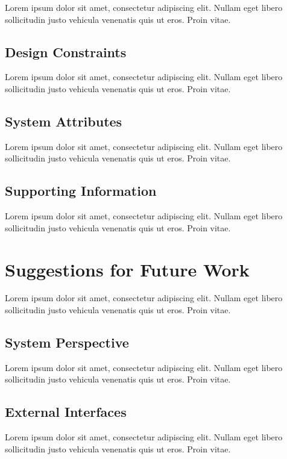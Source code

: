 \documentclass[a4paper]{article}
\begin{document}
        Lorem ipsum dolor sit amet, consectetur adipiscing elit. Nullam eget libero sollicitudin justo vehicula venenatis quis ut eros. Proin vitae.

        \subsection{Design Constraints}

        Lorem ipsum dolor sit amet, consectetur adipiscing elit. Nullam eget libero sollicitudin justo vehicula venenatis quis ut eros. Proin vitae.

        \subsection{System Attributes}

        Lorem ipsum dolor sit amet, consectetur adipiscing elit. Nullam eget libero sollicitudin justo vehicula venenatis quis ut eros. Proin vitae.

        \subsection{Supporting Information}

        Lorem ipsum dolor sit amet, consectetur adipiscing elit. Nullam eget libero sollicitudin justo vehicula venenatis quis ut eros. Proin vitae.

    \section{Suggestions for Future Work}

    Lorem ipsum dolor sit amet, consectetur adipiscing elit. Nullam eget libero sollicitudin justo vehicula venenatis quis ut eros. Proin vitae.

        \subsection{System Perspective}

        Lorem ipsum dolor sit amet, consectetur adipiscing elit. Nullam eget libero sollicitudin justo vehicula venenatis quis ut eros. Proin vitae.

        \subsection{External Interfaces}

        Lorem ipsum dolor sit amet, consectetur adipiscing elit. Nullam eget libero sollicitudin justo vehicula venenatis quis ut eros. Proin vitae.
\end{document}
